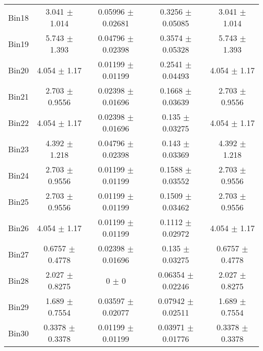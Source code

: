 \begin{tabular}{@{\extracolsep{4pt}}lcccc@{}}
     Bin18 & 3.041 $\pm$ 1.014 & 0.05996 $\pm$ 0.02681 & 0.3256 $\pm$ 0.05085 & 3.041 $\pm$ 1.014 \\ 
     Bin19 & 5.743 $\pm$ 1.393 & 0.04796 $\pm$ 0.02398 & 0.3574 $\pm$ 0.05328 & 5.743 $\pm$ 1.393 \\ 
     Bin20 & 4.054 $\pm$ 1.17 & 0.01199 $\pm$ 0.01199 & 0.2541 $\pm$ 0.04493 & 4.054 $\pm$ 1.17 \\ 
     Bin21 & 2.703 $\pm$ 0.9556 & 0.02398 $\pm$ 0.01696 & 0.1668 $\pm$ 0.03639 & 2.703 $\pm$ 0.9556 \\ 
     Bin22 & 4.054 $\pm$ 1.17 & 0.02398 $\pm$ 0.01696 & 0.135 $\pm$ 0.03275 & 4.054 $\pm$ 1.17 \\ 
     Bin23 & 4.392 $\pm$ 1.218 & 0.04796 $\pm$ 0.02398 & 0.143 $\pm$ 0.03369 & 4.392 $\pm$ 1.218 \\ 
     Bin24 & 2.703 $\pm$ 0.9556 & 0.01199 $\pm$ 0.01199 & 0.1588 $\pm$ 0.03552 & 2.703 $\pm$ 0.9556 \\ 
     Bin25 & 2.703 $\pm$ 0.9556 & 0.01199 $\pm$ 0.01199 & 0.1509 $\pm$ 0.03462 & 2.703 $\pm$ 0.9556 \\ 
     Bin26 & 4.054 $\pm$ 1.17 & 0.01199 $\pm$ 0.01199 & 0.1112 $\pm$ 0.02972 & 4.054 $\pm$ 1.17 \\ 
     Bin27 & 0.6757 $\pm$ 0.4778 & 0.02398 $\pm$ 0.01696 & 0.135 $\pm$ 0.03275 & 0.6757 $\pm$ 0.4778 \\ 
     Bin28 & 2.027 $\pm$ 0.8275 & 0 $\pm$ 0 & 0.06354 $\pm$ 0.02246 & 2.027 $\pm$ 0.8275 \\ 
     Bin29 & 1.689 $\pm$ 0.7554 & 0.03597 $\pm$ 0.02077 & 0.07942 $\pm$ 0.02511 & 1.689 $\pm$ 0.7554 \\ 
     Bin30 & 0.3378 $\pm$ 0.3378 & 0.01199 $\pm$ 0.01199 & 0.03971 $\pm$ 0.01776 & 0.3378 $\pm$ 0.3378 \\ 
\hline\hline
  \end{tabular}
